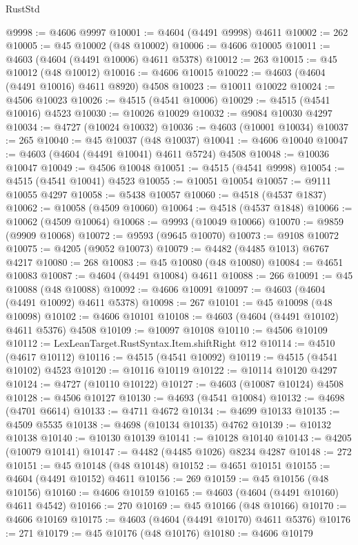 \begin{lexlean}{RustStd}
\begin{coremodule}
@9998 := @4606 @9997
@10001 := @4604 (@4491 @9998) @4611
@10002 := 262
@10005 := @45 @10002 (@48 @10002)
@10006 := @4606 @10005
@10011 := @4603 (@4604 (@4491 @10006) @4611 @5378)
@10012 := 263
@10015 := @45 @10012 (@48 @10012)
@10016 := @4606 @10015
@10022 := @4603 (@4604 (@4491 @10016) @4611 @8920) @4508
@10023 := @10011 @10022
@10024 := @4506 @10023
@10026 := @4515 (@4541 @10006)
@10029 := @4515 (@4541 @10016) @4523
@10030 := @10026 @10029
@10032 := @9084 @10030 @4297
@10034 := @4727 (@10024 @10032)
@10036 := @4603 (@10001 @10034)
@10037 := 265
@10040 := @45 @10037 (@48 @10037)
@10041 := @4606 @10040
@10047 := @4603 (@4604 (@4491 @10041) @4611 @5724) @4508
@10048 := @10036 @10047
@10049 := @4506 @10048
@10051 := @4515 (@4541 @9998)
@10054 := @4515 (@4541 @10041) @4523
@10055 := @10051 @10054
@10057 := @9111 @10055 @4297
@10058 := @5438 @10057
@10060 := @4518 (@4537 @1837)
@10062 := @10058 (@4509 @10060)
@10064 := @4518 (@4537 @1848)
@10066 := @10062 (@4509 @10064)
@10068 := @9993 (@10049 @10066)
@10070 := @9859 (@9909 @10068)
@10072 := @9593 (@9645 @10070)
@10073 := @9108 @10072
@10075 := @4205 (@9052 @10073)
@10079 := @4482 (@4485 @1013) @6767 @4217
@10080 := 268
@10083 := @45 @10080 (@48 @10080)
@10084 := @4651 @10083
@10087 := @4604 (@4491 @10084) @4611
@10088 := 266
@10091 := @45 @10088 (@48 @10088)
@10092 := @4606 @10091
@10097 := @4603 (@4604 (@4491 @10092) @4611 @5378)
@10098 := 267
@10101 := @45 @10098 (@48 @10098)
@10102 := @4606 @10101
@10108 := @4603 (@4604 (@4491 @10102) @4611 @5376) @4508
@10109 := @10097 @10108
@10110 := @4506 @10109
@10112 := LexLeanTarget.RustSyntax.Item.shiftRight @12
@10114 := @4510 (@4617 @10112)
@10116 := @4515 (@4541 @10092)
@10119 := @4515 (@4541 @10102) @4523
@10120 := @10116 @10119
@10122 := @10114 @10120 @4297
@10124 := @4727 (@10110 @10122)
@10127 := @4603 (@10087 @10124) @4508
@10128 := @4506 @10127
@10130 := @4693 (@4541 @10084)
@10132 := @4698 (@4701 @6614)
@10133 := @4711 @4672
@10134 := @4699 @10133
@10135 := @4509 @5535
@10138 := @4698 (@10134 @10135) @4762
@10139 := @10132 @10138
@10140 := @10130 @10139
@10141 := @10128 @10140
@10143 := @4205 (@10079 @10141)
@10147 := @4482 (@4485 @1026) @8234 @4287
@10148 := 272
@10151 := @45 @10148 (@48 @10148)
@10152 := @4651 @10151
@10155 := @4604 (@4491 @10152) @4611
@10156 := 269
@10159 := @45 @10156 (@48 @10156)
@10160 := @4606 @10159
@10165 := @4603 (@4604 (@4491 @10160) @4611 @4542)
@10166 := 270
@10169 := @45 @10166 (@48 @10166)
@10170 := @4606 @10169
@10175 := @4603 (@4604 (@4491 @10170) @4611 @5376)
@10176 := 271
@10179 := @45 @10176 (@48 @10176)
@10180 := @4606 @10179

\end{coremodule}
\end{lexlean}
